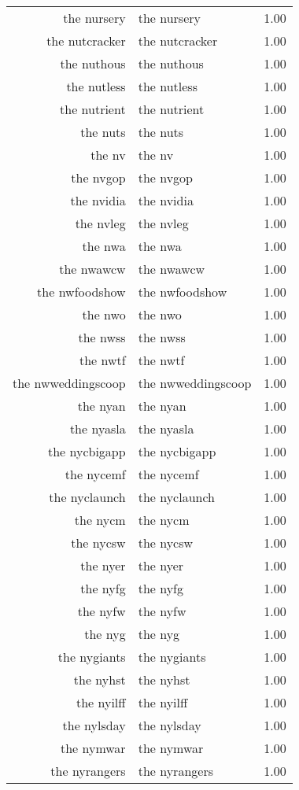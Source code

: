 \begin{table}[ht]
\begin{tabular}{rlr}
  the nursery & the nursery & 1.00 \\ 
  the nutcracker & the nutcracker & 1.00 \\ 
  the nuthous & the nuthous & 1.00 \\ 
  the nutless & the nutless & 1.00 \\ 
  the nutrient & the nutrient & 1.00 \\ 
  the nuts & the nuts & 1.00 \\ 
  the nv & the nv & 1.00 \\ 
  the nvgop & the nvgop & 1.00 \\ 
  the nvidia & the nvidia & 1.00 \\ 
  the nvleg & the nvleg & 1.00 \\ 
  the nwa & the nwa & 1.00 \\ 
  the nwawcw & the nwawcw & 1.00 \\ 
  the nwfoodshow & the nwfoodshow & 1.00 \\ 
  the nwo & the nwo & 1.00 \\ 
  the nwss & the nwss & 1.00 \\ 
  the nwtf & the nwtf & 1.00 \\ 
  the nwweddingscoop & the nwweddingscoop & 1.00 \\ 
  the nyan & the nyan & 1.00 \\ 
  the nyasla & the nyasla & 1.00 \\ 
  the nycbigapp & the nycbigapp & 1.00 \\ 
  the nycemf & the nycemf & 1.00 \\ 
  the nyclaunch & the nyclaunch & 1.00 \\ 
  the nycm & the nycm & 1.00 \\ 
  the nycsw & the nycsw & 1.00 \\ 
  the nyer & the nyer & 1.00 \\ 
  the nyfg & the nyfg & 1.00 \\ 
  the nyfw & the nyfw & 1.00 \\ 
  the nyg & the nyg & 1.00 \\ 
  the nygiants & the nygiants & 1.00 \\ 
  the nyhst & the nyhst & 1.00 \\ 
  the nyilff & the nyilff & 1.00 \\ 
  the nylsday & the nylsday & 1.00 \\ 
  the nymwar & the nymwar & 1.00 \\ 
  the nyrangers & the nyrangers & 1.00 \\ 

\end{tabular}
\end{table}
